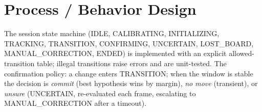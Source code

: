 \section{Process / Behavior Design}
The session state machine (IDLE, CALIBRATING, INITIALIZING, TRACKING, TRANSITION, CONFIRMING, UNCERTAIN,
LOST\_BOARD, MANUAL\_CORRECTION, ENDED) is implemented with an explicit allowed-transition table; illegal
transitions raise errors and are unit-tested. The confirmation policy: a change enters TRANSITION; when the
window is stable the decision is \emph{commit} (best hypothesis wins by margin), \emph{no move} (transient), or
\emph{unsure} (UNCERTAIN, re-evaluated each frame, escalating to MANUAL\_CORRECTION after a timeout).
